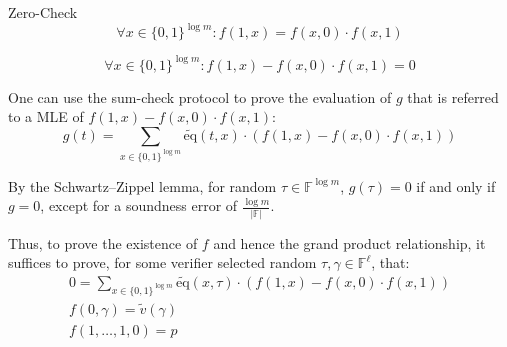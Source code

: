 \documentclass{zkdl-presentation-template}
\begin{document}
    \begin{frame}{Zero-Check}
        \begin{equation*}
            \forall x \in \{0,1\}^{\log m}\colon f(1,x) = f(x, 0) \cdot f(x, 1)
        \end{equation*}
        
        \vspace{-10px}
        \begin{equation*}
            \forall x \in \{0,1\}^{\log m}\colon f(1,x) - f(x, 0) \cdot f(x, 1) = 0
        \end{equation*}
        
        One can use the sum-check protocol to prove the evaluation of $g$ that is referred to a MLE of $f(1,x) - f(x, 0) \cdot f(x, 1)$:
        \begin{equation*}
            g(t) = \sum_{x \in \{0,1\}^{\log m}} \widetilde{\text{eq}}(t,x) \cdot (f(1,x) - f(x, 0) \cdot f(x, 1))
        \end{equation*}
        
        By the Schwartz–Zippel lemma, for random $\tau \in \mathbb{F}^{\log m}$,
        $g(\tau) = 0$ if and only if $g = 0$, except for a soundness error of $\frac{\log m}{|\mathbb{F}|}$.
    \end{frame}

    \begin{frame}
        Thus, to prove the existence of $f$ and hence the grand product relationship, it suffices
        to prove, for some verifier selected random $\tau, \gamma \in \mathbb{F}^\ell$, that:
        \begin{gather}
        \label{eq:grands0}
            0 = \sum_{x \in \{0,1\}^{\log m}} \widetilde{\text{eq}}(x, \tau) \cdot (f(1,x) - f(x, 0) \cdot f(x, 1))\\
        \label{eq:grands1}
            f(0, \gamma) = \widetilde{v}(\gamma)\\
        \label{eq:grands2}
            f(1,\dots,1, 0) = p
        \end{gather}
    \end{frame}
\end{document}

